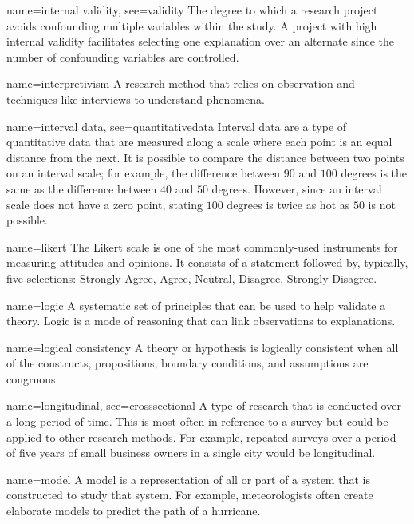 
{name={internal validity},
	see={validity}}
{%
	The degree to which a research project avoids confounding multiple variables within the study. A project with high internal validity facilitates selecting one explanation over an alternate since the number of confounding variables are controlled.
}

{name={interpretivism}}
{%
	A research method that relies on observation and techniques like interviews to understand phenomena. 
}

{name={interval data},
	see={quantitativedata}}
{%
	Interval data are a type of quantitative data that are measured along a scale where each point is an equal distance from the next. It is possible to compare the distance between two points on an interval scale; for example, the difference between $ 90 $ and $ 100 $ degrees is the same as the difference between $ 40 $ and $ 50 $ degrees. However, since an interval scale does not have a zero point, stating $ 100 $ degrees is twice as hot as $ 50 $ is not possible. 
}

{name={likert}}
{%
	The Likert scale is one of the most commonly-used instruments for measuring attitudes and opinions. It consists of a statement followed by, typically, five selections: Strongly Agree, Agree, Neutral, Disagree, Strongly Disagree.
}

{name={logic}}
{%
	A systematic set of principles that can be used to help validate a theory. Logic is a mode of reasoning that can link observations to explanations.
}

{name={logical consistency}}
{%
	A theory or hypothesis is logically consistent when all of the constructs, propositions, boundary conditions, and assumptions are congruous.
}

{name={longitudinal},
	see={crosssectional}}
{%
	A type of research that is conducted over a long period of time. This is most often in reference to a survey but could be applied to other research methods. For example, repeated surveys over a period of five years of small business owners in a single city would be longitudinal. 
}

{name={model}}
{%
	A model is a representation of all or part of a system that is constructed to study that system. For example, meteorologists often create elaborate models to predict 	the path of a hurricane. 
}

